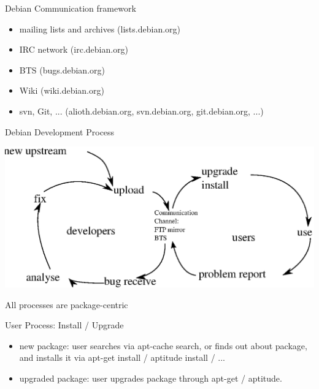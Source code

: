 \documentclass[cjk,dvipdfm,12pt]{beamer}
\begin{document}
\begin{frame}{Debian Communication framework}
 \begin{itemize}
  \item mailing lists and archives (lists.debian.org)
  \item IRC network (irc.debian.org)
  \item BTS (bugs.debian.org)
  \item Wiki (wiki.debian.org)
  \item svn, Git, ... (alioth.debian.org, svn.debian.org,
	git.debian.org, ...)
 \end{itemize}
\end{frame}

\begin{frame}{Debian Development Process}

\includegraphics[width=1\hsize]{image200805/develcycle.eps} 

All processes are package-centric

\end{frame}

\begin{frame}{User Process: Install / Upgrade}
 \begin{itemize}
  \item new package: 
	user searches via apt-cache search, or finds out about package,
	and installs it via apt-get install / aptitude install / ...
  \item upgraded package:
	user upgrades package through 
	apt-get  / aptitude.	
 \end{itemize}
\end{frame}
\end{document}

